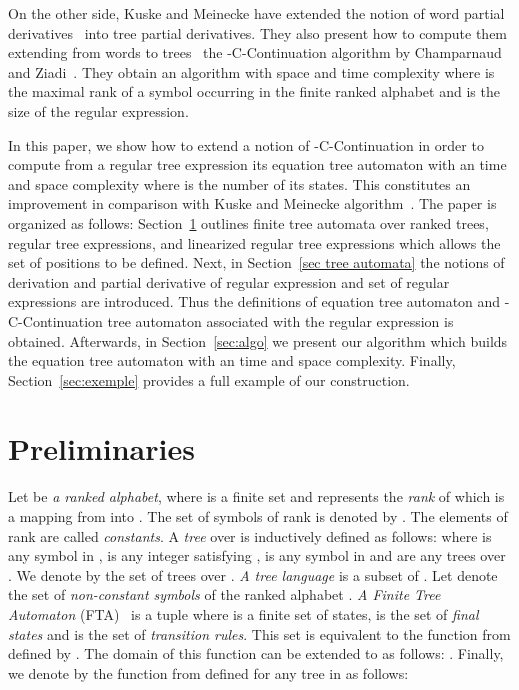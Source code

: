 \documentclass{llncs}
\begin{document}
 On the other side, Kuske and Meinecke have extended the notion of  word partial derivatives~\cite{antimirov} into  tree partial derivatives. They also present how to compute them extending  from words to trees~\cite{automate2} the -C-Continuation algorithm by Champarnaud and Ziadi~\cite{ZPC1}. They obtain an algorithm with  space and time complexity where  is the maximal rank of a symbol  occurring  in the finite ranked alphabet  and  is the size of the regular expression.

In this paper, we show how to extend a notion of -C-Continuation in order to compute from a regular tree expression its equation tree automaton  with an  time and space complexity where  is the number of its states. This constitutes an improvement in comparison with  Kuske and Meinecke algorithm~\cite{automate2}. The paper is organized as follows: Section~\ref{sec prelim} outlines finite tree automata over ranked trees, regular tree expressions, and linearized regular tree expressions which allows the set of positions to be defined. Next, in Section~\ref{sec tree automata} the notions of derivation and partial derivative of regular expression and set of regular expressions are 
introduced. Thus the definitions of equation tree automaton and -C-Continuation tree automaton associated with the regular expression  is obtained. Afterwards, in Section~\ref{sec:algo} we present our algorithm which builds the equation tree automaton with an  time and space complexity. Finally, Section~\ref{sec:exemple} provides a full example of our construction.

\section{Preliminaries}\label{sec prelim}

    Let  be  \emph{a ranked alphabet}, where  is a finite set and  represents the  \emph{rank} of  which is a mapping from  into . The set of symbols of rank  is denoted by . The elements of rank  are called  \emph{constants}. A \emph{tree}  over    is inductively defined as follows:  where  is any symbol in  ,  is any integer satisfying ,  is any symbol in  and  are any  trees over . We denote by  the set of trees over .  \emph{A tree language} is a subset of . Let  denote the set of  \emph{non-constant symbols} of the ranked alphabet . \emph{A Finite Tree Automaton} (FTA)~\cite{automate1,automate2}  is a tuple  where  is a finite set of states,  is the set of \emph{final states} 
and   is the set of  \emph{transition rules}. This set is equivalent to the function  from   defined  by . The domain of this function can be extended to    as follows: .  Finally, we denote by  the function from    defined for any tree in  as follows: 
    
\end{document}
